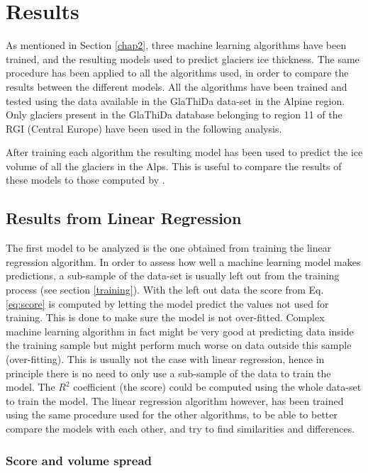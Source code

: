 \chapter{Results}\label{chap3}
\thispagestyle{plain}

As mentioned in Section \ref{chap2}, three machine learning algorithms have been trained, and the resulting models used to predict glaciers ice thickness. The same procedure has been applied to all the algorithms used, in order to compare the results between the different models. 
All the algorithms have been trained and tested using the data available in the GlaThiDa data-set in the Alpine region. Only glaciers present in the GlaThiDa database belonging to region 11 of the RGI (Central Europe) have been used in the following analysis.

After training each algorithm the resulting model has been used to predict the ice volume of all the glaciers in the Alps. This is useful to compare the results of these models to those computed by \citet{Farinotti2019}.

\section{Results from Linear Regression}\label{linear}
The first model to be analyzed is the one obtained from training the linear regression algorithm. In order to assess how well a machine learning model makes predictions, a sub-sample of the data-set is usually left out from the training process (see section \ref{training}). With the left out data the score from Eq. \ref{eq:score} is computed by letting the model predict the values not used for training. This is done to make sure the model is not over-fitted. Complex machine learning algorithm in fact might be very good at predicting data inside the training sample but might perform much worse on data outside this sample (over-fitting). 
This is usually not the case with linear regression, hence in principle there is no need to only use a sub-sample of the data to train the model. The $R^2$ coefficient (the score) could be computed using the whole data-set to train the model. The linear regression algorithm however, has been trained using the same procedure used for the other algorithms, to be able to better compare the models with each other, and try to find similarities and differences.     

\subsection{Score and volume spread}\label{lr-score}

